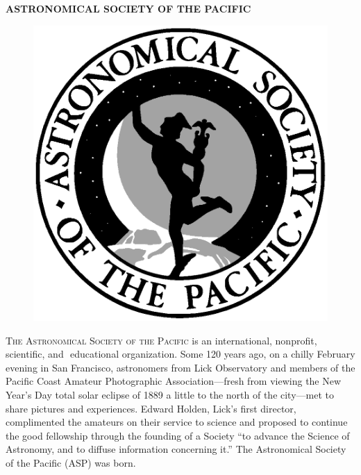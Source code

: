
%

\pagestyle{empty}
\null
\setlength{\headheight}{0cm}
\setlength{\headsep}{0cm}
\setlength{\textheight}{21.6cm}
\setlength{\footskip}{0cm}

\begin{center}
{\LARGE \bfseries {ASTRONOMICAL SOCIETY OF THE PACIFIC}\\}
\vspace{1.0cm}
\end{center}


{\selectfont 

\begin{figure}
  \vspace{-0.75cm}
  \centering
  \includegraphics[width=5.0truecm, trim=0 15 0 0]{./frontmatter/logo_bw.eps}
\end{figure}

\noindent 
\textsc{The Astronomical Society of the Pacific} is an international, 
nonprofit, scientific, and \,\,educational organization. 
Some 120 years ago, on a chilly February evening in San Francisco, 
astronomers from Lick Observatory and members of the Pacific Coast 
Amateur Photographic Association---fresh from viewing the New Year's Day 
total solar eclipse of 1889 a little to the north of the city---met to share 
pictures and experiences. Edward Holden, Lick's first director, complimented 
the amateurs on their service to science and proposed to continue the good 
fellowship through the founding of a Society ``to advance the Science of 
Astronomy, and to diffuse information concerning it.'' The Astronomical 
Society of the Pacific (ASP) was born.

}
